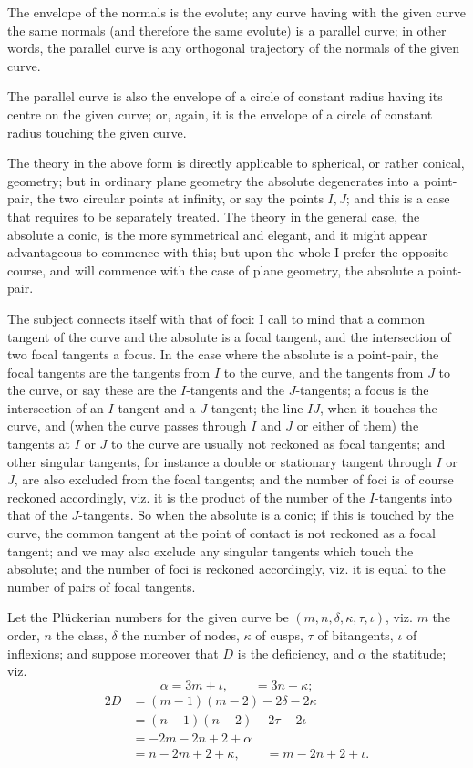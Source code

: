 ﻿\documentclass[11pt,a4paper]{article}
\theoremstyle{plain}
\theoremstyle{definition}
\begin{document}
The envelope of the normals is the evolute; any curve having with the given
curve the same normals (and therefore the same evolute) is a parallel
curve; in other words, the parallel curve is any orthogonal trajectory of
the normals of the given curve.

The parallel curve is also the envelope of a circle of constant radius
having its centre on the given curve; or, again, it is the envelope of a
circle of constant radius touching the given curve.

The theory in the above form is directly applicable to spherical, or rather
conical, geometry; but in ordinary plane geometry the absolute degenerates
into a point-pair, the two circular points at infinity, or say the points
\(I,J\); and this is a case that requires to be separately treated. The
theory in the general case, the absolute a conic, is the more symmetrical
and elegant, and it might appear advantageous to commence with this; but
upon the whole I prefer the opposite course, and will commence with the
case of plane geometry, the absolute a point-pair.

The subject connects itself with that of foci: I call to mind that a common
tangent of the curve and the absolute is a focal tangent, and the
intersection of two focal tangents a focus. In the case where the absolute
is a point-pair, the focal tangents are the tangents from \(I\) to the
curve, and the tangents from \(J\) to the curve, or say these are the
\(I\)-tangents and the \(J\)-tangents; a focus is the intersection of an
\(I\)-tangent and a \(J\)-tangent; the line \(IJ\), when it touches the
curve, and (when the curve passes through \(I\) and \(J\) or either of
them) the tangents at \(I\) or \(J\) to the curve are usually not reckoned
as focal tangents; and other singular tangents, for instance a double or
stationary tangent through \(I\) or \(J\), are also excluded from the focal
tangents; and the number of foci is of course reckoned accordingly, viz. it
is the product of the number of the \(I\)-tangents into that of the
\(J\)-tangents. So when the absolute is a conic; if this is touched by the
curve, the common tangent at the point of contact is not reckoned as a
focal tangent; and we may also exclude any singular tangents which touch
the absolute; and the number of foci is reckoned accordingly, viz. it is
equal to the number of pairs of focal tangents.

Let the Pl\"uckerian numbers for the given curve be
\((m,n,\delta,\kappa,\tau,\iota)\), viz. \(m\) the order, \(n\) the class,
\(\delta\) the number of nodes, \(\kappa\) of cusps, \(\tau\) of
bitangents, \(\iota\) of inflexions; and suppose moreover that \(D\) is the
deficiency, and \(\alpha\) the statitude; viz.
\[
\alpha=3m+\iota,\qquad =3n+\kappa;
\]
\[
\begin{aligned}
2D&=(m-1)(m-2)-2\delta-2\kappa\\
&=(n-1)(n-2)-2\tau-2\iota\\
&=-2m-2n+2+\alpha\\
&=n-2m+2+\kappa,\qquad =m-2n+2+\iota.
\end{aligned}
\]
\end{document}
